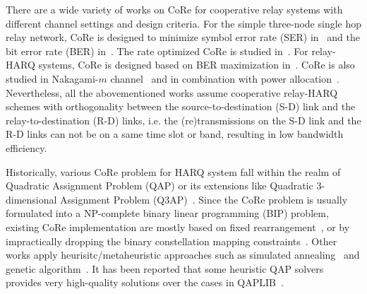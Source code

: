 \documentclass[conference]{IEEEtran}
\begin{document}
There are a wide variety of works on CoRe for cooperative relay
systems with different channel settings and design criteria.
For the simple three-node single hop relay network, CoRe is designed to minimize
symbol error rate (SER) in~\cite{seddik2008trans} and the bit error rate (BER)
in~\cite{khormuji2007improving}. The rate optimized CoRe is studied
in~\cite{khormuji2008rate}. For relay-HARQ systems, CoRe is designed based
on BER maximization in~\cite{kim2009design}. CoRe is also studied in
Nakagami-$m$ channel~\cite{ryu2011ber} and in combination with power
allocation~\cite{yu2012power}. Nevertheless, all the abovementioned
works assume cooperative relay-HARQ schemes with orthogonality between the
source-to-destination (S-D) link and the relay-to-destination (R-D) links, i.e.
the (re)transmissions on the S-D link and the R-D links can not be on a same
time slot or band, resulting in low bandwidth efficiency. 

Historically, various CoRe problem for HARQ system fall within the realm of
Quadratic Assignment Problem (QAP) or its extensions like Quadratic
3-dimensional Assignment Problem (Q3AP)~\cite{harvind2005symbol}. Since the
CoRe problem is usually formulated into a NP-complete binary linear programming
(BIP) problem, existing CoRe implementation are mostly based on fixed
rearrangement~\cite{seddik2008trans, yu2012power}, or by impractically dropping
the binary constellation mapping constraints~\cite{sediq2011optimized}.
Other works apply heurisitc/metaheuristic approaches such as simulated
annealing~\cite{khormuji2008rate} and genetic algorithm~\cite{kim2009design}.
It has been reported that some heuristic QAP solvers~\cite{} provides very
high-quality solutions over the cases in QAPLIB~\cite{burkard1997qaplib}.
\end{document}
